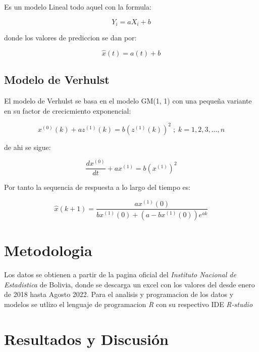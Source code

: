 \documentclass[a4paper,10pt]{article}
\begin{document}
Es un modelo Lineal todo aquel con la formula:

\begin{equation}
 Y_i = aX_i + b
\end{equation}

donde los valores de prediccion se dan por:

\begin{equation}
 \widehat{x}(t)=a(t) + b
\end{equation}

\subsection{Modelo de Verhulst}

El modelo de Verhulst se basa en el modelo GM(1, 1) con una pequeña  variante en su factor de crecicmiento exponencial:~\cite{verl_model}

\begin{equation}
  x^{(0)} (k) + az^{(1)} (k) = b \left( z^{(1)}(k) \right)^2 \; ; \; k = 1,2,3,...,n
\end{equation}

de ahi se sigue:

\begin{equation}
  \frac{d x^{(0)}}{dt} + ax^{(1)} = b\left( x^{(1)} \right)^2
\end{equation}

Por tanto la sequencia de respuesta a lo largo del tiempo es:

\begin{equation}
 \widehat{x}(k+1) = \frac{ax^{(1)}(0)}{bx^{(1)}(0)+ (a-bx^{(1)}(0)) e^{ak}}
\end{equation}

\section{Metodologia}
Los datos se obtienen a partir de la pagina oficial del \emph{Instituto Nacional de Estadistica} de Bolivia, donde se descarga un excel con los valores del \ipc desde enero de 2018 hasta Agosto 2022.
Para el analisis y programacion de los datos y modelos se utlizo el lenguaje de programacion \emph{R} con su respectivo IDE \emph{R-studio}

\section{Resultados y Discusión}
\end{document}
